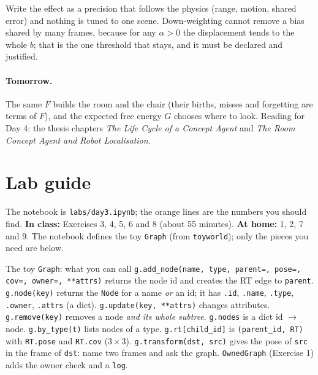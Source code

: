 \documentclass[11pt]{article}
\begin{document}
\begin{keyidea}
Write the effect as a precision that follows the physics (range, motion, shared error) and nothing is tuned to one scene. Down-weighting cannot remove a bias shared by many frames, because for any $\alpha>0$ the displacement tends to the whole $b$; that is the one threshold that stays, and it must be declared and justified.
\end{keyidea}

\paragraph{Tomorrow.} The same $F$ builds the room and the chair (their births, misses and forgetting are terms of $F$), and the expected free energy $G$ chooses where to look. Reading for Day 4: the thesis chapters \emph{The Life Cycle of a Concept Agent} and \emph{The Room Concept Agent and Robot Localisation}.

\section{Lab guide}

The notebook is \texttt{labs/day3.ipynb}; the orange lines are the numbers you should find. \textbf{In class:} Exercises 3, 4, 5, 6 and 8 (about 55 minutes). \textbf{At home:} 1, 2, 7 and 9. The notebook defines the toy \texttt{Graph} (from \texttt{toyworld}); only the pieces you need are below.

\begin{labhelp}{The toy \texttt{Graph}: what you can call}
\texttt{g.add\_node(name, type, parent=, pose=, cov=, owner=, **attrs)} returns the node id and creates the RT edge to \texttt{parent}. \texttt{g.node(key)} returns the \texttt{Node} for a name \emph{or} an id; it has \texttt{.id}, \texttt{.name}, \texttt{.type}, \texttt{.owner}, \texttt{.attrs} (a dict). \texttt{g.update(key, **attrs)} changes attributes. \texttt{g.remove(key)} removes a node \emph{and its whole subtree}. \texttt{g.nodes} is a dict id $\to$ node. \texttt{g.by\_type(t)} lists nodes of a type. \texttt{g.rt[child\_id]} is \texttt{(parent\_id, RT)} with \texttt{RT.pose} and \texttt{RT.cov} ($3\times3$). \texttt{g.transform(dst, src)} gives the pose of \texttt{src} in the frame of \texttt{dst}: name two frames and ask the graph. \texttt{OwnedGraph} (Exercise 1) adds the owner check and a \texttt{log}.
\end{labhelp}
\end{document}
